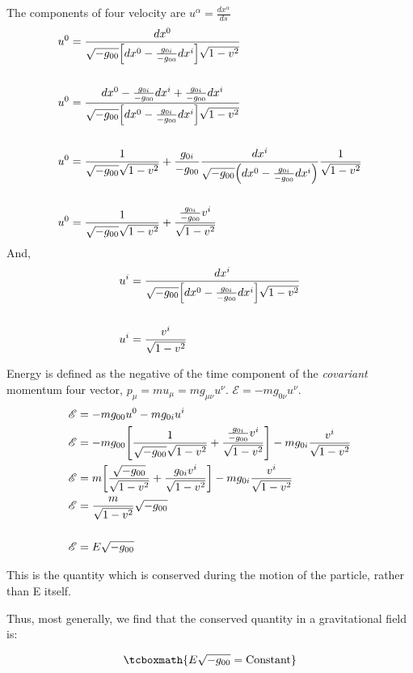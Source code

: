 \documentclass[12pt, letterpaper]{report}
\begin{document}
The components of four velocity are $u^\alpha= \frac{dx^\alpha}{ds}$
\begin{align*}
    u^0&= \frac{dx^0}{\sqrt{-g_{00}}\qty[dx^0-\frac{g_{0i}}{-g_{00}}dx^i]\sqrt{1-v^2}}\\\\
    u^0&= \frac{dx^0-\frac{g_{0i}}{-g_{00}}dx^i+\frac{g_{0i}}{-g_{00}}dx^i}{\sqrt{-g_{00}}\qty[dx^0-\frac{g_{0i}}{-g_{00}}dx^i]\sqrt{1-v^2}}\\\\
    u^0&= \frac{1}{\sqrt{-g_{00}}\sqrt{1-v^2}}+\frac{g_{0i}}{-g_{00}}\frac{dx^i}{\sqrt{-g_{00}}\qty(dx^0-\frac{g_{0i}}{-g_{00}}dx^i)}\frac{1}{\sqrt{1-v^2}}\\\\
    u^0&= \frac{1}{\sqrt{-g_{00}}\sqrt{1-v^2}}+\frac{\frac{g_{0i}}{-g_{00}}v^i}{\sqrt{1-v^2}}
\end{align*}
And,
\begin{align*}
    u^i&= \frac{dx^i}{\sqrt{-g_{00}}\qty[dx^0-\frac{g_{0i}}{-g_{00}}dx^i]\sqrt{1-v^2}}\\\\
    u^i&= \frac{v^i}{\sqrt{1-v^2}}
\end{align*}

Energy is defined as the negative of the time component of the \emph{covariant} momentum four vector, $p_\mu= m u_\mu= mg_{\mu\nu}u^\nu$. $\mathscr{E}= -mg_{0\nu}u^\nu$. 
\begin{align*}
    \mathscr{E}&= -mg_{00}u^0- mg_{0i}u^i\\
    \mathscr{E}&= -mg_{00}\qty[\frac{1}{\sqrt{-g_{00}}\sqrt{1-v^2}}+\frac{\frac{g_{0i}}{-g_{00}}v^i}{\sqrt{1-v^2}}]- mg_{0i}\frac{v^i}{\sqrt{1-v^2}}\\
    \mathscr{E}&= m\qty[\frac{\sqrt{-g_{00}}}{\sqrt{1-v^2}}+\frac{{g_{0i}}v^i}{\sqrt{1-v^2}}]- mg_{0i}\frac{v^i}{\sqrt{1-v^2}}\\
    \mathscr{E}&= \frac{m}{\sqrt{1-v^2}}\sqrt{-g_{00}}\\\\
    \mathscr{E}&= E\sqrt{-g_{00}}
\end{align*}

This is the quantity which is conserved during the motion of the particle, rather than E itself.

Thus, most generally, we find that the conserved quantity in a gravitational field is: 

\begin{equation}
    \tcboxmath{E\sqrt{-g_{00}}= \text{Constant}} \label{eq2.5}
\end{equation}
\end{document}
